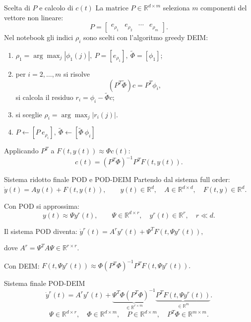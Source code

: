 \documentclass[10pt,aspectratio=169,handout]{beamer}
\begin{document}
\begin{frame}{Scelta di $P$ e calcolo di $c(t)$}
La matrice $P\in\mathbb{R}^{d\times m}$ seleziona $m$ componenti del vettore non lineare:
\[
P=\begin{bmatrix}e_{\rho_1}&e_{\rho_2}&\cdots&e_{\rho_m}\end{bmatrix}.
\]
Nel notebook gli indici $\rho_i$ sono scelti con l'algoritmo greedy DEIM:
\begin{enumerate}
  \item $\rho_1=\arg\max_j|\phi_1(j)|, \ P = [e_{\rho_1}], \ \tilde{\Phi}=[\phi_1]$;
  \item per $i=2,\ldots,m$ si risolve
  \[
  (P^T\tilde{\Phi})c=P^T\phi_i,
  \]
  si calcola il residuo $r_i=\phi_i-\tilde{\Phi}c$;
  \item si sceglie $\rho_i=\arg\max_j|r_i(j)|$.
  \item $P \leftarrow [P \ e_{\rho_i}], \ \tilde{\Phi} \leftarrow [\tilde{\Phi} \ \phi_i]$
\end{enumerate}
Applicando $P^T$ a $F(t,y(t))\approx\Phi c(t)$:
\[
c(t)=(P^T\Phi)^{-1}P^TF(t,y(t)).
\]
\end{frame}

\begin{frame}{Sistema ridotto finale POD e POD-DEIM}
Partendo dal sistema full order:
$\dot y(t)=Ay(t)+F(t,y(t)), 
\qquad y(t)\in\mathbb{R}^{d}, 
\quad A\in\mathbb{R}^{d\times d},
\quad F(t,y)\in\mathbb{R}^{d}.$


Con POD si approssima:
\[
y(t)\approx \Psi y^r(t),
\qquad 
\Psi\in\mathbb{R}^{d\times r},
\quad y^r(t)\in\mathbb{R}^{r},
\quad r\ll d.
\]

Il sistema POD diventa:
$\dot y^r(t)
=
A^r y^r(t)
+
\Psi^T F(t,\Psi y^r(t)),$

dove $A^r=\Psi^T A\Psi\in\mathbb{R}^{r\times r}.$


Con DEIM:
$F(t,\Psi y^r(t))
\approx
\Phi(P^T\Phi)^{-1}P^TF(t,\Psi y^r(t)).$


\begin{block}{Sistema finale POD-DEIM}
\[
\dot y^r(t)
=
A^r y^r(t)
+
\underbrace{\Psi^T\Phi(P^T\Phi)^{-1}}_{\in\mathbb{R}^{r\times m}}
\underbrace{P^TF(t,\Psi y^r(t))}_{\in\mathbb{R}^{m}}.
\]
\[
\Psi\in\mathbb{R}^{d\times r},\quad
\Phi\in\mathbb{R}^{d\times m},\quad
P\in\mathbb{R}^{d\times m},\quad
P^T\Phi\in\mathbb{R}^{m\times m}.
\]
\end{block}
\end{frame}
\end{document}
